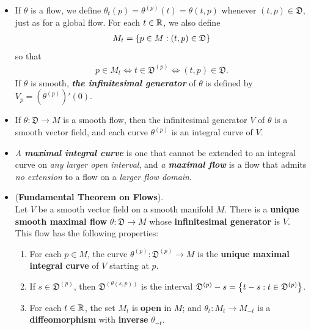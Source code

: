 \documentclass[11pt]{article}
\begin{document}
\begin{itemize}
\item \begin{definition}
If $\theta$ is a flow, we define $\theta_t(p) = \theta^{(p)}(t) = \theta(t, p)$ whenever $(t, p) \in \mathfrak{D}$, just as for a global flow. For each $t \in {\mathbb R}$, we also define
\begin{align}
M_t = \left\{p \in M: (t, p) \in \mathfrak{D}\right\} \label{eqn: local_flow_starting_points}
\end{align} so that
\begin{align*}
p \in M_t \Leftrightarrow t \in \mathfrak{D}^{(p)} \Leftrightarrow (t,p) \in \mathfrak{D}.
\end{align*} If $\theta$ is smooth, \emph{\textbf{the infinitesimal generator}} of $\theta$ is defined by $V_p =  (\theta^{(p)})'(0)$.
\end{definition}

\item \begin{proposition}
If $\theta: \mathfrak{D} \rightarrow M$ is a smooth flow, then the infinitesimal generator $V$ of $\theta$ is a smooth vector field, and each curve $\theta^{(p)}$ is an integral curve of $V$.
\end{proposition}

\item \begin{definition}
\emph{A \textbf{maximal integral curve}} is one that cannot be extended to an integral curve on \emph{any larger open interval}, and \emph{a \textbf{maximal flow}} is a flow that admits \emph{no extension} to a flow on a \emph{larger flow domain}.
\end{definition}

\item \begin{theorem} (\textbf{Fundamental Theorem on Flows}). \citep{lee2003introduction}\\
Let $V$ be a smooth vector field on a smooth manifold $M$. There is a \textbf{unique smooth maximal flow} $\theta: \mathfrak{D} \rightarrow M$
whose \textbf{infinitesimal generator} is $V$. This flow has the following properties:
\begin{enumerate}
\item For each $p \in M$, the curve $\theta^{(p)}: \mathfrak{D}^{(p)} \rightarrow M$ is the \textbf{unique maximal integral curve} of $V$ starting at $p$.
\item If $s \in \mathfrak{D}^{(p)}$, then $\mathfrak{D}^{(\theta(s, p))}$ is the interval $\mathfrak{D}^{(p)} - s = \left\{t - s: t \in \mathfrak{D}^{(p)}\right\}$.
\item For each $t \in {\mathbb R}$, the set $M_t$ is \textbf{open} in $M$; and $\theta_t: M_t \rightarrow M_{-t}$ is a \textbf{diffeomorphism} with \textbf{inverse} $\theta_{-t}$.
\end{enumerate}
\end{theorem}


\end{itemize}
\end{document}
